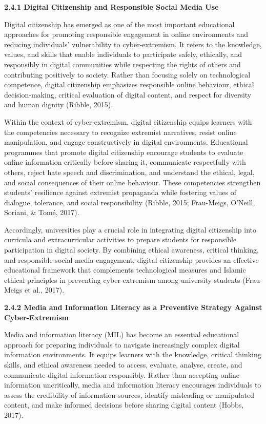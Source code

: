 \documentclass[11pt,a4paper]{article}
\begin{document}
	\textbf{2.4.1 Digital Citizenship and Responsible Social Media Use}
	
	Digital citizenship has emerged as one of the most important educational approaches for promoting responsible engagement in online environments and reducing individuals' vulnerability to cyber-extremism. It refers to the knowledge, values, and skills that enable individuals to participate safely, ethically, and responsibly in digital communities while respecting the rights of others and contributing positively to society. Rather than focusing solely on technological competence, digital citizenship emphasizes responsible online behaviour, ethical decision-making, critical evaluation of digital content, and respect for diversity and human dignity (Ribble, 2015).
	
	Within the context of cyber-extremism, digital citizenship equips learners with the competencies necessary to recognize extremist narratives, resist online manipulation, and engage constructively in digital environments. Educational programmes that promote digital citizenship encourage students to evaluate online information critically before sharing it, communicate respectfully with others, reject hate speech and discrimination, and understand the ethical, legal, and social consequences of their online behaviour. These competencies strengthen students' resilience against extremist propaganda while fostering values of dialogue, tolerance, and social responsibility (Ribble, 2015; Frau-Meigs, O'Neill, Soriani, \& Tomé, 2017).
	
	Accordingly, universities play a crucial role in integrating digital citizenship into curricula and extracurricular activities to prepare students for responsible participation in digital society. By combining ethical awareness, critical thinking, and responsible social media engagement, digital citizenship provides an effective educational framework that complements technological measures and Islamic ethical principles in preventing cyber-extremism among university students (Frau-Meigs et al., 2017).
	
	\textbf{2.4.2 Media and Information Literacy as a Preventive Strategy Against Cyber-Extremism}
	
	Media and information literacy (MIL) has become an essential educational approach for preparing individuals to navigate increasingly complex digital information environments. It equips learners with the knowledge, critical thinking skills, and ethical awareness needed to access, evaluate, analyse, create, and communicate digital information responsibly. Rather than accepting online information uncritically, media and information literacy encourages individuals to assess the credibility of information sources, identify misleading or manipulated content, and make informed decisions before sharing digital content (Hobbs, 2017).
	
\end{document}
